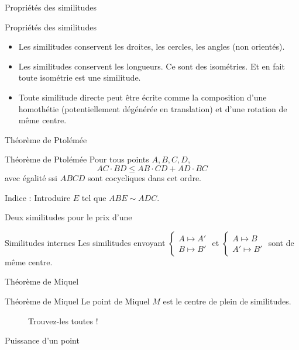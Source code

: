 \documentclass[french]{beamer}
\theoremstyle{plain}
\begin{document}
\begin{frame}{Propriétés des similitudes}
  \begin{exampleblock}{Propriétés des similitudes}
    \begin{itemize}
      \item Les similitudes conservent les droites, les cercles, les angles (non orientés).
      \item Les similitudes conservent les longueurs. Ce sont des isométries. Et en fait toute isométrie est une similitude.
      \item Toute similitude directe peut être écrite comme la composition d'une homothétie (potentiellement dégénérée en translation) et d'une rotation de même centre.
    \end{itemize}
  \end{exampleblock}
\end{frame}


\begin{frame}{Théorème de Ptolémée}
  \begin{exampleblock}{Théorème de Ptolémée}
    Pour tous points $ A, B, C, D $,
    $$ AC \cdot BD \le AB \cdot CD + AD \cdot BC $$
    avec égalité ssi $ ABCD $ sont cocycliques dans cet ordre.
  \end{exampleblock}
  Indice : Introduire $ E $ tel que $ ABE \sim ADC $.
\end{frame}


\begin{frame}{Deux similitudes pour le prix d'une}
  \begin{exampleblock}{Similitudes internes}
    Les similitudes envoyant $ \begin{cases}A \mapsto A' \\ B \mapsto B'\end{cases} $ et $ \begin{cases}A \mapsto B \\ A' \mapsto B'\end{cases} $ sont de même centre.
  \end{exampleblock}
\end{frame}


\begin{frame}{Théorème de Miquel}
  \begin{exampleblock}{Théorème de Miquel}
    Le point de Miquel $ M $ est le centre de plein de similitudes.
  \end{exampleblock}
  \begin{figure}
    \centering
    \caption{Trouvez-les toutes !}
  \end{figure}
\end{frame}


\begin{frame}{Puissance d'un point}
  \begin{figure}
    \centering
  \end{figure}
\end{frame}
\end{document}
